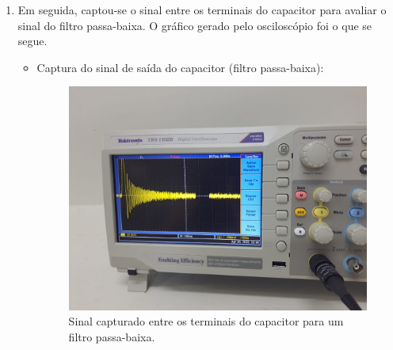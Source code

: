 \documentclass[letterpaper, 12pt]{article}
\begin{document}
\begin{enumerate}
    \item Em seguida, captou-se o sinal entre os terminais do capacitor para avaliar o sinal do filtro passa-baixa. O gráfico gerado pelo osciloscópio foi o que se segue.
    \begin{itemize}
        \item Captura do sinal de saída do capacitor (filtro passa-baixa):
        \begin{figure}[h]
            \centering
            \includegraphics[width=0.5\linewidth]{figures/Capacitor_signal.jpeg}
            \caption{Sinal capturado entre os terminais do capacitor para um filtro passa-baixa.}
            \label{fig:Low-pass_filter}
        \end{figure}
    \end{itemize}
\end{enumerate}
\end{document}
